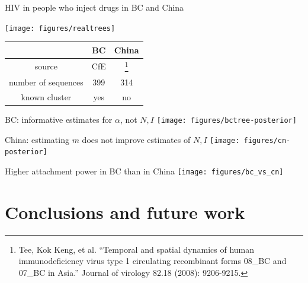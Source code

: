 \documentclass{beamer}
\begin{document}
\begin{frame}{HIV in people who inject drugs in BC and China}
  \begin{center}
    \vspace{-1cm}
    \texttt{[image: figures/realtrees]}

    \begin{tabular}{ccc}
      & BC & China \\
      \hline
      source & CfE & \footnote{\tiny Tee, Kok Keng, et al. ``Temporal and spatial dynamics of human immunodeficiency virus type 1 circulating recombinant forms 08\_BC and 07\_BC in Asia.'' Journal of virology 82.18 (2008): 9206-9215.} \\
      number of sequences & 399 & 314 \\
      known cluster & yes & no \\
      \hline
    \end{tabular}
  \end{center}
\end{frame}

\begin{frame}{BC: informative estimates for $\alpha$, not $N, I$}
  \vspace{-0.5cm}
  \texttt{[image: figures/bctree-posterior]}
\end{frame}

\begin{frame}{China: estimating $m$ does not improve estimates of $N, I$}
  \vspace{-0.5cm}
  \texttt{[image: figures/cn-posterior]}
\end{frame}

\begin{frame}{Higher attachment power in BC than in China}
  \vspace{-0.5cm}
  \texttt{[image: figures/bc\_vs\_cn]}
\end{frame}

\section{Conclusions and future work}
\end{document}
